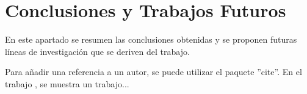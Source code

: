 \section{Conclusiones y Trabajos Futuros}
En este apartado se resumen las conclusiones obtenidas y se proponen futuras líneas de investigación que se deriven del trabajo.

Para añadir una referencia a un autor, se puede utilizar el paquete ''cite''. En el trabajo \cite{references:sotelo07}, se muestra un trabajo...